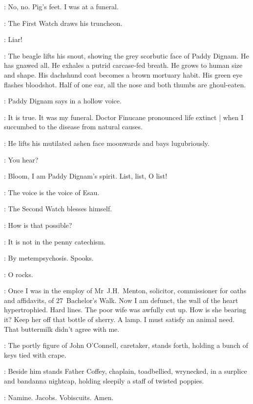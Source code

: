 \Bloom:
No,
no.
Pig's feet.
I was at a funeral.

:
The First Watch draws his truncheon.

\FirstWatch:
Liar!

:
The beagle lifts his snout,
showing the grey scorbutic face of Paddy Dignam.
He has gnawed all.
He exhales a putrid carcase-fed breath.
He grows to human size and shape.
His dachshund coat becomes a brown mortuary habit.
His green eye flashes bloodshot.
Half of one ear,
all the nose and both thumbs are ghoul-eaten.

:
Paddy Dignam says in a hollow voice.

\Dignam:
It is true.
It was my funeral.
Doctor Finucane pronounced life extinct |
when I succumbed to the disease from natural causes.

:
He lifts his mutilated ashen face moonwards and bays lugubriously.

\Bloom:
You hear?

\Dignam:
Bloom,
I am Paddy Dignam's spirit.
List,
list,
O list!

\Bloom:
The voice is the voice of Esau.

:
The Second Watch blesses himself.

\SecondWatch:
How is that possible?

\FirstWatch:
It is not in the penny catechism.

\Dignam:
By metempsychosis.
Spooks.

\Voice:
O rocks.

\Dignam:
Once I was in the employ of Mr~J.H.~Menton,
solicitor,
commissioner for oaths and affidavits,
of 27~Bachelor's Walk.
Now I am defunct,
the wall of the heart hypertrophied.
Hard lines.
The poor wife was awfully cut up.
How is she bearing it?
Keep her off that bottle of sherry.
A lamp.
I must satisfy an animal need.
That buttermilk didn't agree with me.

:
The portly figure of John O'Connell,
caretaker,
stands forth,
holding a bunch of keys tied with crape.

:
Beside him stands Father Coffey,
chaplain,
toadbellied,
wrynecked,
in a surplice and bandanna nightcap,
holding sleepily a staff of twisted poppies.

\FrCoffey:
Namine.
Jacobs.
Vobiscuits.
Amen.

